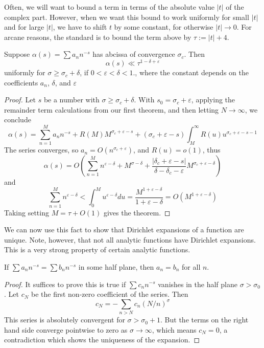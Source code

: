 Often, we will want to bound a term in terms of the absolute value $|t|$ of the complex part. However, when we want this bound to work uniformly for small $|t|$ and for large $|t|$, we have to shift $t$ by some constant, for otherwise $|t| \to 0$. For arcane reasons, the standard is to bound the term above by $\tau := |t| + 4$.

\begin{theorem}
    Suppose $\alpha(s) = \sum a_n n^{-s}$ has abcissa of convergence $\sigma_c$. Then
    \[ \alpha(s) \ll \tau^{1 - \delta + \varepsilon} \]
    uniformly for $\sigma \geq \sigma_c + \delta$, if $0 < \varepsilon < \delta < 1$., where the constant depends on the coefficients $a_n$, $\delta$, and $\varepsilon$
\end{theorem}
\begin{proof}
    Let $s$ be a number with $\sigma \geq \sigma_c + \delta$. With $s_0 = \sigma_c + \varepsilon$, applying the remainder term calculations from our first theorem, and then letting $N \to \infty$, we conclude
    \[ \alpha(s) = \sum_{n = 1}^M a_n n^{-s} + R(M) M^{\sigma_c + \varepsilon - s} + (\sigma_c + \varepsilon - s) \int_M^\infty R(u) u^{\sigma_c + \varepsilon - s - 1} \]
    The series converges, so $a_n = O(n^{\sigma_c + \varepsilon})$, and $R(u) = o(1)$, thus
    \[ \alpha(s) = O \left( \sum_{n = 1}^M n^{\varepsilon - \delta} + M^{\sigma - \delta} + \frac{|\delta_c + \varepsilon - s|}{\delta - \delta_c - \varepsilon} M^{\sigma_c + \varepsilon - \delta} \right) \]
    and
    \[ \sum_{n = 1}^M n^{\varepsilon - \delta} < \int_0^M u^{\varepsilon - \delta} du = \frac{M^{1 + \varepsilon - \delta}}{1 + \varepsilon - \delta} = O \left( M^{1 + \varepsilon - \delta} \right) \]
    Taking setting $M = \tau + O(1)$ gives the theorem.
\end{proof}

We can now use this fact to show that Dirichlet expansions of a function are unique. Note, however, that not all analytic functions have Dirichlet expansions. This is a very strong property of certain analytic functions.

\begin{theorem}
    If $\sum a_n n^{-s} = \sum b_n n^{-s}$ in some half plane, then $a_n = b_n$ for all $n$.
\end{theorem}
\begin{proof}
    It suffices to prove this is true if $\sum c_n n^{-s}$ vanishes in the half plane $\sigma > \sigma_0$. Let $c_N$ be the first non-zero coefficient of the series. Then
    \[ c_N = - \sum_{n > N} c_n (N/n)^\sigma \]
    This series is absolutely convergent for $\sigma > \sigma_0 + 1$. But the terms on the right hand side converge pointwise to zero as $\sigma \to \infty$, which means $c_N = 0$, a contradiction which shows the uniqueness of the expansion.
\end{proof}

